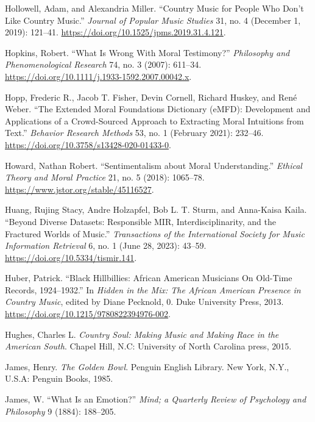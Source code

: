 \documentclass[phdthesis,12pt,final]{wuthesis}
\newlength{\cslhangindent}
\newenvironment{CSLReferences}[2] %
{\begin{list}{}{%
	\setlength{\itemindent}{0pt}
	\setlength{\leftmargin}{0pt}
	\setlength{\parsep}{0pt}
	\ifodd #1
	\setlength{\leftmargin}{\cslhangindent}
	\setlength{\itemindent}{-1\cslhangindent}
	\fi
	\setlength{\itemsep}{#2\baselineskip}}}
{\end{list}}
\theoremstyle{definition}
\theoremstyle{definition}
\theoremstyle{definition}
\theoremstyle{definition}
\theoremstyle{remark}
\begin{document}
\begin{CSLReferences}{1}{0}
Hollowell, Adam, and Alexandria Miller. {``Country {Music} for {People Who Don}'t {Like Country Music}.''} \emph{Journal of Popular Music Studies} 31, no. 4 (December 1, 2019): 121--41. \url{https://doi.org/10.1525/jpms.2019.31.4.121}.

Hopkins, Robert. {``What {Is Wrong With Moral Testimony}?''} \emph{Philosophy and Phenomenological Research} 74, no. 3 (2007): 611--34. \url{https://doi.org/10.1111/j.1933-1592.2007.00042.x}.

Hopp, Frederic R., Jacob T. Fisher, Devin Cornell, Richard Huskey, and René Weber. {``The Extended {Moral Foundations Dictionary} ({eMFD}): {Development} and Applications of a Crowd-Sourced Approach to Extracting Moral Intuitions from Text.''} \emph{Behavior Research Methods} 53, no. 1 (February 2021): 232--46. \url{https://doi.org/10.3758/s13428-020-01433-0}.

Howard, Nathan Robert. {``Sentimentalism about {Moral Understanding}.''} \emph{Ethical Theory and Moral Practice} 21, no. 5 (2018): 1065--78. \url{https://www.jstor.org/stable/45116527}.

Huang, Rujing Stacy, Andre Holzapfel, Bob L. T. Sturm, and Anna-Kaisa Kaila. {``Beyond {Diverse Datasets}: {Responsible MIR}, {Interdisciplinarity}, and the {Fractured Worlds} of {Music}.''} \emph{Transactions of the International Society for Music Information Retrieval} 6, no. 1 (June 28, 2023): 43--59. \url{https://doi.org/10.5334/tismir.141}.

Huber, Patrick. {``Black {Hillbillies}: {African American Musicians On Old-Time Records}, 1924--1932.''} In \emph{Hidden in the {Mix}: {The African American Presence} in {Country Music}}, edited by Diane Pecknold, 0. Duke University Press, 2013. \url{https://doi.org/10.1215/9780822394976-002}.

Hughes, Charles L. \emph{Country Soul: Making Music and Making Race in the {American South}}. Chapel Hill, N.C: University of North Carolina press, 2015.

James, Henry. \emph{The Golden Bowl}. Penguin {English} Library. New York, N.Y., U.S.A: Penguin Books, 1985.

James, W. {``What Is an Emotion?''} \emph{Mind; a Quarterly Review of Psychology and Philosophy} 9 (1884): 188--205.


\end{CSLReferences}
\end{document}
